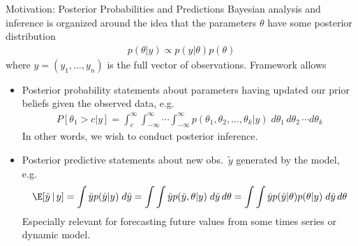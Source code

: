 \documentclass[aspectratio=169, handout]{beamer}
\begin{document}
{\footnotesize
\begin{frame}{Motivation: Posterior Probabilities and Predictions}
Bayesian analysis and inference is organized around the
idea that the parameters $\theta$ have some
\alert{posterior distribution}
\begin{align*}
  p(\theta|y)
  \propto
  p(y|\theta)
  p(\theta)
\end{align*}
where $y=(y_1,\ldots,y_n)$ is the full vector of observations.
Framework allows
\begin{itemize}
  \item \alert{Posterior probability statements} about parameters having
    updated our prior beliefs given the observed data, e.g.
    \begin{align*}
      P[\theta_1>c|y]
      =
      \int_c^\infty
      \int_{-\infty}^\infty
      \cdots
      \int_{-\infty}^\infty
      p(\theta_1,\theta_2,\ldots,\theta_k|y)
      \;
      d\theta_1\,
      d\theta_2\,
      \cdots
      d\theta_k
    \end{align*}
    In other words, we wish to conduct \alert{posterior inference}.

  \item \alert{Posterior predictive statements} about new obs.\
    $\tilde{y}$ generated by the model, e.g.
    \begin{align*}
      \E[\tilde{y}\,|\,y]
      =
      \int
      \tilde{y}
      p(\tilde{y}|y)
      \;d\tilde{y}
      =
      \int
      \int
      \tilde{y}
      p(\tilde{y},\theta|y)
      \;d\tilde{y}
      \,d\theta
      =
      \int
      \int
      \tilde{y}
      p(\tilde{y}|\theta)
      p(\theta|y)
      \;d\tilde{y}
      \,d\theta
    \end{align*}
    Especially relevant for \alert{forecasting} future values from some
    times series or dynamic model.
\end{itemize}
\end{frame}
}
\end{document}
